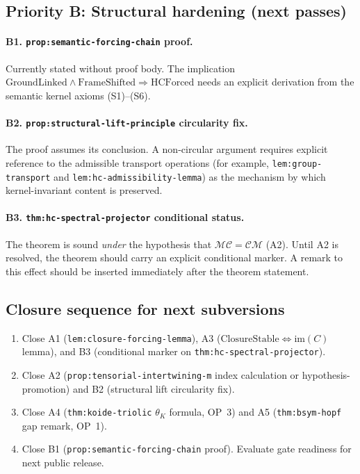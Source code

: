 \subsection*{Priority B: Structural hardening (next passes)}

\paragraph{B1. \texttt{prop:semantic-forcing-chain} proof.}
Currently stated without proof body. The implication
$\mathrm{GroundLinked} \wedge \mathrm{FrameShifted} \Rightarrow \mathrm{HCForced}$
needs an explicit derivation from the semantic kernel axioms (S1)--(S6).

\paragraph{B2. \texttt{prop:structural-lift-principle} circularity fix.}
The proof assumes its conclusion. A non-circular argument requires explicit
reference to the admissible transport operations (for example, \texttt{lem:group-transport} and \texttt{lem:hc-admissibility-lemma}) as the
mechanism by which kernel-invariant content is preserved.

\paragraph{B3. \texttt{thm:hc-spectral-projector} conditional status.}
The theorem is sound \emph{under} the hypothesis that
$\mathcal{M}\mathcal{C} = \mathcal{C}\mathcal{M}$ (A2). Until A2 is resolved,
the theorem should carry an explicit conditional marker. A remark to this
effect should be inserted immediately after the theorem statement.

\subsection*{Closure sequence for next subversions}

\begin{enumerate}[label=\textbf{v2.27.\arabic*:}, leftmargin=4em, start=6]
  \item Close A1 (\texttt{lem:closure-forcing-lemma}), A3
    ($\mathrm{ClosureStable} \Leftrightarrow \mathrm{im}(C)$ lemma),
    and B3 (conditional marker on \texttt{thm:hc-spectral-projector}).
  \item Close A2 (\texttt{prop:tensorial-intertwining-m} index calculation
    or hypothesis-promotion) and B2 (structural lift circularity fix).
  \item Close A4 (\texttt{thm:koide-triolic} $\theta_K$ formula, OP~3)
    and A5 (\texttt{thm:bsym-hopf} gap remark, OP~1).
  \item Close B1 (\texttt{prop:semantic-forcing-chain} proof).
    Evaluate gate readiness for next public release.
\end{enumerate}

